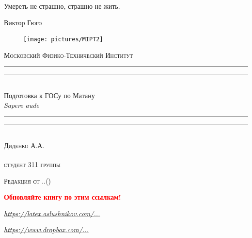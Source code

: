 \newpage
\thispagestyle{empty}
\begingroup
{}
\epigraph{Умереть не страшно, страшно не жить.}{Виктор Гюго}\centering
\settowidth{\unitlength}{\LARGE\scshape Московский Физико-Технический Институт}

\begin{figure}[!h]
\center
\texttt{[image: pictures/MIPT2]}
\end{figure}
\vspace*{0.5\baselineskip}
{\LARGE\scshape Московский Физико-Технический Институт}\\[0.7\baselineskip]
\rule{\unitlength}{1.6pt}\vspace*{-\baselineskip}\vspace*{2pt}
\rule{\unitlength}{0.4pt}\\[1.4\baselineskip]
{\Huge Подготовка к ГОСу по Матану}\\[\baselineskip]
{\large \itshape Sapere aude}\\[0.6\baselineskip]
\rule{\unitlength}{0.4pt}\vspace*{-\baselineskip}\vspace{3.2pt}
\rule{\unitlength}{1.6pt}\\[\baselineskip]
{\Large\scshape Диденко А.А. \\ $ $\\студент 311 группы}\par
\vspace*{1.5\baselineskip}  


{\LARGE\scshape Редакция от \twodigit\day.\twodigit\month.\the\year \;(\currenttime)}\par %

\mbox{}

\textcolor{red}{\huge \textbf{Обновляйте книгу по этим ссылкам!}}

\vspace*{0.5\baselineskip} 

\href{http://latex.aslushnikov.com/compile?git=https://github.com/DidenkoAndre/GOS_book&target=_main.tex}{\large \textcolor{Purplemountainmajesty}{\textit{https://latex.aslushnikov.com/...}}}

\vspace*{0.5\baselineskip} 

\href{https://www.dropbox.com/sh/7e5mfj8q68o2ipp/AAD8XvpZhiJzFbEh_IeH305ia?dl=0&preview=GOSBook.pdf}{\large \textcolor{Purplemountainmajesty}{\textit{https://www.dropbox.com/...}}}

